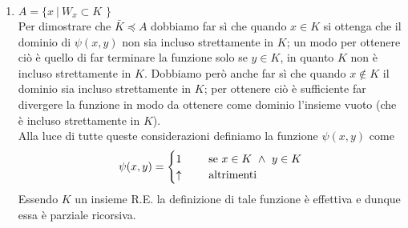 \documentclass[a4paper,oneside,titlepage]{book}
\begin{document}
\begin{enumerate}[label=\fbox{\arabic*}]
\item $A = \text{\{ } x \ | \ W_x \subset K \text{ \}}$
\\ Per dimostrare che $\bar{K} \preceq A$ dobbiamo far sì che quando $x \in K$ si ottenga che il dominio di $\psi(x,y)$ non sia incluso strettamente in $K$; un modo per ottenere ciò è quello di far terminare la funzione solo se $y \in K$, in quanto $K$ non è incluso strettamente in $K$. Dobbiamo però anche far sì che quando $x \notin K$ il dominio sia incluso strettamente in $K$; per ottenere ciò è sufficiente far divergere la funzione in modo da ottenere come dominio l'insieme vuoto (che è incluso strettamente in $K$).
\\ Alla luce di tutte queste considerazioni definiamo la funzione $\psi(x,y)$ come
\[
\psi(x,y) =
\begin{cases}
1& \hspace{0.5cm} \text{se } x \in K \ \wedge \ y \in K \\
\uparrow& \hspace{0.5cm} \text{altrimenti}
\end{cases}
\]
Essendo $K$ un insieme R.E. la definizione di tale funzione è effettiva e dunque essa è parziale ricorsiva.
\end{enumerate}
\end{document}
